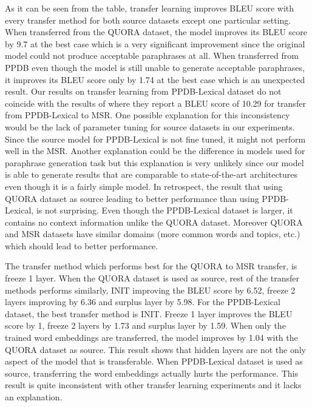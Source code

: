 As it can be seen from the table, transfer learning improves BLEU score with every transfer method for both source datasets except one particular setting. When transferred from the QUORA dataset, the model improves its BLEU score by 9.7 at the best case which is a very significant improvement since the original model could not produce acceptable paraphrases at all. When transferred from PPDB even though the model is still unable to generate acceptable paraphrases, it improves its BLEU score only by 1.74 at the best case which is an unexpected result. Our results on transfer learning from PPDB-Lexical dataset do not coincide with the results of \cite{brad} where they report a BLEU score of 10.29 for transfer from PPDB-Lexical to MSR. One possible explanation for this inconsistency would be the lack of parameter tuning for source datasets in our experiments. Since the source model for PPDB-Lexical is not fine tuned, it might not perform well in the MSR. Another explanation could be the difference in models used for paraphrase generation task but this explanation is very unlikely since our model is able to generate results that are comparable to state-of-the-art architectures even though it is a fairly simple model. In retrospect, the result that using QUORA dataset as source leading to better performance than using PPDB-Lexical, is not surprising. Even though the PPDB-Lexical dataset is larger, it contains no context information unlike the QUORA dataset. Moreover QUORA and MSR datasets have similar domains (more common words and topics, etc.) which should lead to better performance.

The transfer method which performs best for the QUORA to MSR transfer, is freeze 1 layer. When the QUORA dataset is used as source, rest of the transfer methods performs similarly, INIT improving the BLEU score by 6.52, freeze 2 layers improving by 6.36 and surplus layer by 5.98. For the PPDB-Lexical dataset, the best transfer method is INIT. Freeze 1 layer improves the BLEU score by 1, freeze 2 layers by 1.73 and surplus layer by 1.59. When only the trained word embeddings are transferred, the model improves by 1.04 with the QUORA dataset as source. This result shows that hidden layers are not the only aspect of the model that is transferable. When PPDB-Lexical dataset is used as source, transferring the word embeddings actually hurts the performance. This result is quite inconsistent with other transfer learning experiments and it lacks an explanation.

